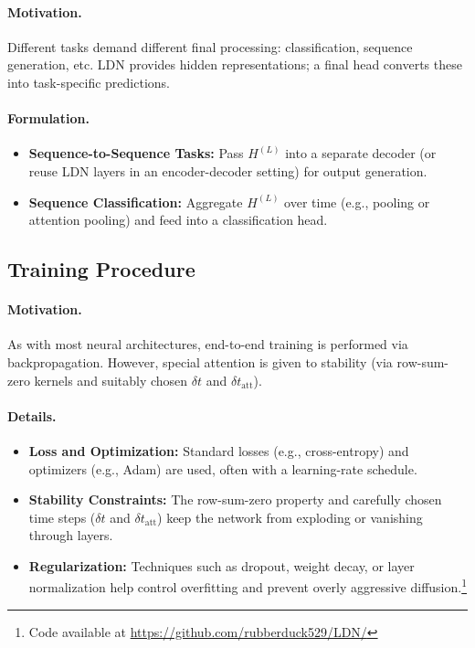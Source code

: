 \paragraph{Motivation.}
Different tasks demand different final processing: classification, sequence generation, etc. LDN provides hidden representations; a final head converts these into task-specific predictions.

\paragraph{Formulation.}
\begin{itemize}
    \item \textbf{Sequence-to-Sequence Tasks:}
    Pass \(H^{(L)}\) into a separate decoder (or reuse LDN layers in an encoder-decoder setting) for output generation.
    \item \textbf{Sequence Classification:}
    Aggregate \(H^{(L)}\) over time (e.g., pooling or attention pooling) and feed into a classification head.
\end{itemize}

\subsection{Training Procedure}
\paragraph{Motivation.}
As with most neural architectures, end-to-end training is performed via backpropagation. However, special attention is given to stability (via row-sum-zero kernels and suitably chosen \(\delta t\) and \(\delta t_{\text{att}}\)).

\paragraph{Details.}
\begin{itemize}
    \item \textbf{Loss and Optimization:} 
    Standard losses (e.g., cross-entropy) and optimizers (e.g., Adam) are used, often with a learning-rate schedule.
    \item \textbf{Stability Constraints:}
    The row-sum-zero property and carefully chosen time steps (\(\delta t\) and \(\delta t_{\text{att}}\)) keep the network from exploding or vanishing through layers.
    \item \textbf{Regularization:} 
    Techniques such as dropout, weight decay, or layer normalization help control overfitting and prevent overly aggressive diffusion.\footnote{Code available at \href{https://github.com/rubberduck529/LDN/}{https://github.com/rubberduck529/LDN/}}
\end{itemize}

